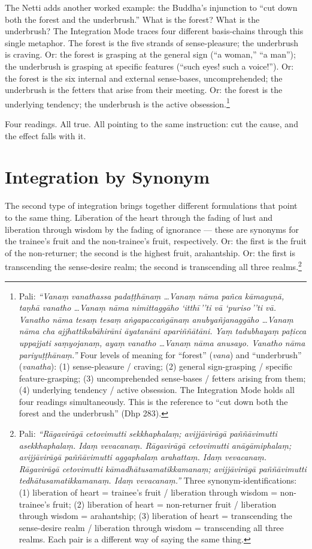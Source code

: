 The Netti adds another worked example: the Buddha's injunction to ``cut down both the forest and the underbrush.'' What is the forest? What is the underbrush? The Integration Mode traces four different basis-chains through this single metaphor. The forest is the five strands of sense-pleasure; the underbrush is craving. Or: the forest is grasping at the general sign (``a woman,'' ``a man''); the underbrush is grasping at specific features (``such eyes! such a voice!''). Or: the forest is the six internal and external sense-bases, uncomprehended; the underbrush is the fetters that arise from their meeting. Or: the forest is the underlying tendency; the underbrush is the active obsession.\footnote{Pali: \textit{``Vanaṃ vanathassa padaṭṭhānaṃ \ldots Vanaṃ nāma pañca kāmaguṇā, taṇhā vanatho \ldots Vanaṃ nāma nimittaggāho `itthī\,''ti vā `puriso\,''ti vā. Vanatho nāma tesaṃ tesaṃ aṅgapaccaṅgānaṃ anubyañjanaggāho \ldots Vanaṃ nāma cha ajjhattikabāhirāni āyatanāni apariññātāni. Yaṃ tadubhayaṃ paṭicca uppajjati saṃyojanaṃ, ayaṃ vanatho \ldots Vanaṃ nāma anusayo. Vanatho nāma pariyuṭṭhānaṃ.''} Four levels of meaning for ``forest'' (\textit{vana}) and ``underbrush'' (\textit{vanatha}): (1) sense-pleasure / craving; (2) general sign-grasping / specific feature-grasping; (3) uncomprehended sense-bases / fetters arising from them; (4) underlying tendency / active obsession. The Integration Mode holds all four readings simultaneously. This is the reference to ``cut down both the forest and the underbrush'' (Dhp 283).}

Four readings. All true. All pointing to the same instruction: cut the cause, and the effect falls with it.

\section*{Integration by Synonym}

The second type of integration brings together different formulations that point to the same thing. Liberation of the heart through the fading of lust and liberation through wisdom by the fading of ignorance --- these are synonyms for the trainee's fruit and the non-trainee's fruit, respectively. Or: the first is the fruit of the non-returner; the second is the highest fruit, arahantship. Or: the first is transcending the sense-desire realm; the second is transcending all three realms.\footnote{Pali: \textit{``Rāgavirāgā cetovimutti sekkhaphalaṃ; avijjāvirāgā paññāvimutti asekkhaphalaṃ. Idaṃ vevacanaṃ. Rāgavirāgā cetovimutti anāgāmiphalaṃ; avijjāvirāgā paññāvimutti aggaphalaṃ arahattaṃ. Idaṃ vevacanaṃ. Rāgavirāgā cetovimutti kāmadhātusamatikkamanaṃ; avijjāvirāgā paññāvimutti tedhātusamatikkamanaṃ. Idaṃ vevacanaṃ.''} Three synonym-identifications: (1) liberation of heart = trainee's fruit / liberation through wisdom = non-trainee's fruit; (2) liberation of heart = non-returner fruit / liberation through wisdom = arahantship; (3) liberation of heart = transcending the sense-desire realm / liberation through wisdom = transcending all three realms. Each pair is a different way of saying the same thing.}

